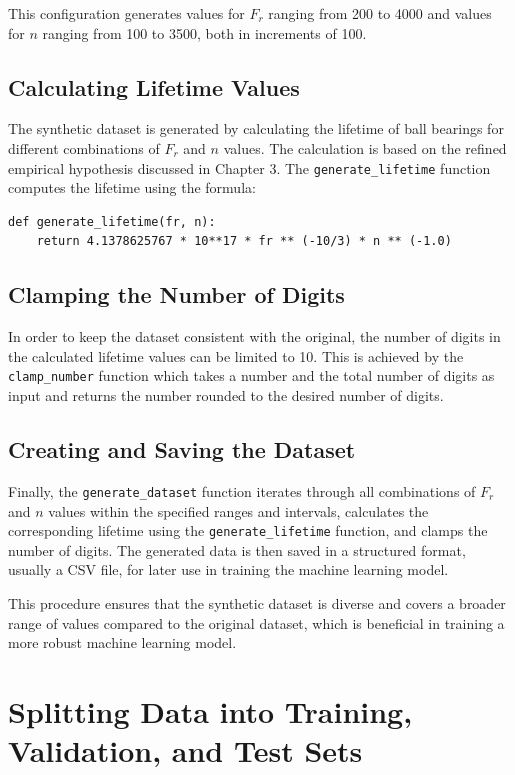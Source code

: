 This configuration generates values for \(F_r\) ranging from 200 to 4000 and values for \(n\) ranging from 100 to 3500, both in increments of 100.

\subsection*{Calculating Lifetime Values}

The synthetic dataset is generated by calculating the lifetime of ball bearings for different combinations of \(F_r\) and \(n\) values. The calculation is based on the refined empirical hypothesis discussed in Chapter 3. The \texttt{generate\_lifetime} function computes the lifetime using the formula:

\begin{verbatim}
def generate_lifetime(fr, n):
    return 4.1378625767 * 10**17 * fr ** (-10/3) * n ** (-1.0)
\end{verbatim}

\subsection*{Clamping the Number of Digits}

In order to keep the dataset consistent with the original, the number of digits in the calculated lifetime values can be limited to 10. This is achieved by the \texttt{clamp\_number} function which takes a number and the total number of digits as input and returns the number rounded to the desired number of digits.

\subsection*{Creating and Saving the Dataset}

Finally, the \texttt{generate\_dataset} function iterates through all combinations of \(F_r\) and \(n\) values within the specified ranges and intervals, calculates the corresponding lifetime using the \texttt{generate\_lifetime} function, and clamps the number of digits. The generated data is then saved in a structured format, usually a CSV file, for later use in training the machine learning model.

This procedure ensures that the synthetic dataset is diverse and covers a broader range of values compared to the original dataset, which is beneficial in training a more robust machine learning model.


\section{Splitting Data into Training, Validation, and Test Sets}

